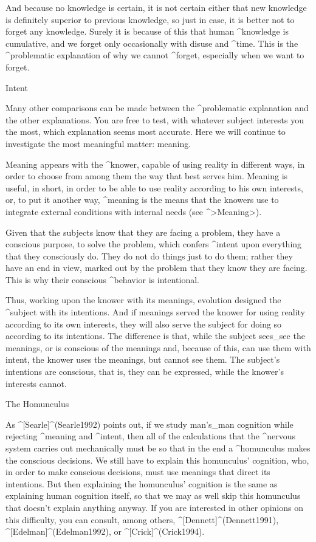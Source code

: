 And because no knowledge is certain, it is not certain either that new
knowledge is definitely superior to previous knowledge, so just in case,
it is better not to forget any knowledge. Surely it is because of this
that human ^{knowledge} is cumulative, and we forget only occasionally
with disuse and ^{time}. This is the ^{problematic explanation} of why
we cannot ^{forget}, especially when we want to forget.


\Section Intent

Many other comparisons can be made between the ^{problematic
explanation} and the other explanations. You are free to test, with
whatever subject interests you the most, which explanation seems most
accurate. Here we will continue to investigate the most meaningful
matter: meaning.

Meaning appears with the ^{knower}, capable of using reality in
different ways, in order to choose from among them the way that best
serves him. Meaning is useful, in short, in order to be able to use
reality according to his own interests, or, to put it another way,
^{meaning} is the means that the knowers use to integrate external
conditions with internal needs (see ^>Meaning>).

Given that the subjects know that they are facing a problem, they have a
conscious purpose, to solve the problem, which confers ^{intent} upon
everything that they consciously do. They do not do things just to do
them; rather they have an end in view, marked out by the problem that
they know they are facing. This is why their conscious ^{behavior} is
intentional.

Thus, working upon the knower with its meanings, evolution
\hbox{designed} the ^{subject} with its intentions. And if meanings
served the knower for using reality according to its own interests, they
will also serve the subject for doing so according to its intentions.
The difference is that, while the subject sees_{see} the meanings, or is
conscious of the meanings and, because of this, can use them with
intent, the knower uses the meanings, but cannot see them. The subject's
intentions are conscious, that is, they can be expressed, while the
knower's interests cannot.


\Section The Homunculus

As ^[Searle]^(Searle1992) points out, if we study man's_{man} cognition
while rejecting ^{meaning} and ^{intent}, then all of the calculations
that the ^{nervous system} carries out mechanically must be so that in
the end a ^{homunculus} makes the conscious decisions. We still have to
explain this homunculus' cognition, who, in order to make conscious
decisions, must use meanings that direct its intentions. But then
explaining the homunculus' cognition is the same as explaining human
cognition itself, so that we may as well skip this homunculus that
doesn't explain anything anyway. If you are interested in other opinions
on this difficulty, you can consult, among others,
 ^[Dennett]^(Dennett1991),
 ^[Edelman]^(Edelman1992), or
 ^[Crick]^(Crick1994).

